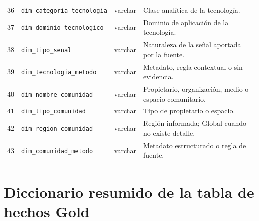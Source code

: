 \documentclass[12pt,a4paper]{article}
\newcommand{\pathcode}[1]{\begingroup\small\ttfamily\nolinkurl{#1}\endgroup}
\begin{document}
\begin{longtable}{P{0.9cm} P{4.1cm} P{2.8cm} P{6.0cm}}
36 & \pathcode{dim_categoria_tecnologia} & varchar & Clase analítica de la tecnología. \\
37 & \pathcode{dim_dominio_tecnologico} & varchar & Dominio de aplicación de la tecnología. \\
38 & \pathcode{dim_tipo_senal} & varchar & Naturaleza de la señal aportada por la fuente. \\
39 & \pathcode{dim_tecnologia_metodo} & varchar & Metadato, regla contextual o sin evidencia. \\
40 & \pathcode{dim_nombre_comunidad} & varchar & Propietario, organización, medio o espacio comunitario. \\
41 & \pathcode{dim_tipo_comunidad} & varchar & Tipo de propietario o espacio. \\
42 & \pathcode{dim_region_comunidad} & varchar & Región informada; Global cuando no existe detalle. \\
43 & \pathcode{dim_comunidad_metodo} & varchar & Metadato estructurado o regla de fuente. \\
\bottomrule
\end{longtable}
\normalsize

\section{Diccionario resumido de la tabla de hechos Gold}
\end{document}
